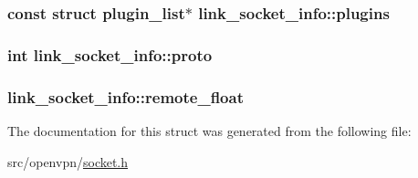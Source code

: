 \subsubsection[{plugins}]{\setlength{\rightskip}{0pt plus 5cm}const struct {\bf plugin\+\_\+list}$\ast$ link\+\_\+socket\+\_\+info\+::plugins}\label{structlink__socket__info_a66afefd202aee2159647bb43e144e5c0}
\hypertarget{structlink__socket__info_ac30179fadd9ed2ba57d48f8350c8fa38}{}
\subsubsection[{proto}]{\setlength{\rightskip}{0pt plus 5cm}int link\+\_\+socket\+\_\+info\+::proto}\label{structlink__socket__info_ac30179fadd9ed2ba57d48f8350c8fa38}
\hypertarget{structlink__socket__info_a595e18b8f2080b760f7ad3d0a5eb7a37}{}
\subsubsection[{remote\+\_\+float}]{ link\+\_\+socket\+\_\+info\+::remote\+\_\+float}\label{structlink__socket__info_a595e18b8f2080b760f7ad3d0a5eb7a37}


The documentation for this struct was generated from the following file\+:\begin{DoxyCompactItemize}
\item 
src/openvpn/\hyperlink{socket_8h}{socket.\+h}\end{DoxyCompactItemize}
